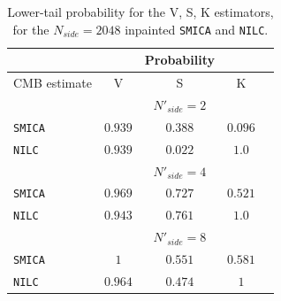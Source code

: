 \begin{table}
\centering
\caption{Lower-tail probability for the V, S, K estimators, for the $N_{side} = 2048$ inpainted \texttt{SMICA} and \texttt{NILC}.}
\label{table:1}
\begin{tabular}{@{}lcccc}
\hline 
  & & Probability & \\
\hline  
CMB estimate & V & S & K \\ 
\hline  
 & & $N'_{side}=2$ & \\
\texttt{SMICA} & $0.939$ & $0.388$ & $0.096$ \\ 
\texttt{NILC} & $0.939$ & $0.022$ & $1.0$  \\
 & & $ N'_{side} = 4 $ & \\
\texttt{SMICA} & $ 0.969 $ & $ 0.727 $ & $ 0.521 $ \\
\texttt{NILC} & $ 0.943 $ & $ 0.761 $ & $ 1.0 $ \\ 
 & & $N'_{side} = 8$ & \\
\texttt{SMICA} & $ 1 $ & $ 0.551 $ & $ 0.581 $ \\
\texttt{NILC} & $ 0.964 $ & $ 0.474 $ & $ 1 $ \\
\hline
\end{tabular} 
\end{table}

